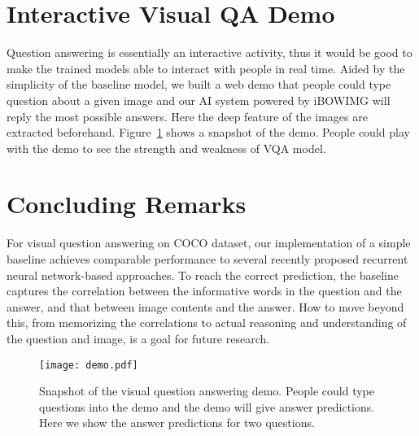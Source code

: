 \documentclass{article} \usepackage{nips14submit_e,times}
\begin{document}
\section{Interactive Visual QA Demo} 

Question answering is essentially an interactive activity, thus it would be good to make the trained models able to interact with people in real time. Aided by the simplicity of the baseline model, we built a web demo that people could type question about a given image and our AI system powered by iBOWIMG will reply the most possible answers. Here the deep feature of the images are extracted beforehand. Figure~\ref{vqa_demo} shows a snapshot of the demo. People could play with the demo to see the strength and weakness of VQA model.


\section{Concluding Remarks}



For visual question answering on COCO dataset, our implementation of a simple baseline achieves comparable performance to several recently proposed recurrent neural network-based approaches. To reach the correct prediction, the baseline captures the correlation between the informative words in the question and the answer, and that between image contents and the answer. How to move beyond this, from memorizing the correlations to actual reasoning and understanding of the question and image, is a goal for future research.

\begin{figure}
\begin{center}
\texttt{[image: demo.pdf]}
\end{center}
\caption{Snapshot of the visual question answering demo. People could type questions into the demo and the demo will give answer predictions. Here we show the answer predictions for two questions.}\label{vqa_demo}
\end{figure}








\end{document}
